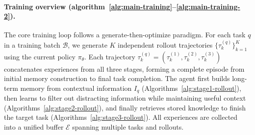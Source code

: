 \paragraph{Training overview (algorithm~\ref{alg:main-training}--\ref{alg:main-training-2}).}
The core training loop follows a generate-then-optimize paradigm. For each task $q$ in a training batch $\mathcal{B}$, we generate $K$ independent rollout trajectories $\{\tau_k^{(q)}\}_{k=1}^K$ using the current policy $\pi_\theta$. Each trajectory $\tau_k^{(q)} = (\tau_k^{(1)}, \tau_k^{(2)}, \tau_k^{(3)})$ concatenates experiences from all three stages, forming a complete episode from initial memory construction to final task completion. The agent first builds long-term memory from contextual information $I_q$ (Algorithms~\ref{alg:stage1-rollout}), then learns to filter out distracting information while maintaining useful context (Algorithms~\ref{alg:stage2-rollout}), and finally retrieves stored knowledge to finish the target task (Algorithms~\ref{alg:stage3-rollout}). All experiences are collected into a unified buffer $\mathcal{E}$ spanning multiple tasks and rollouts. 

